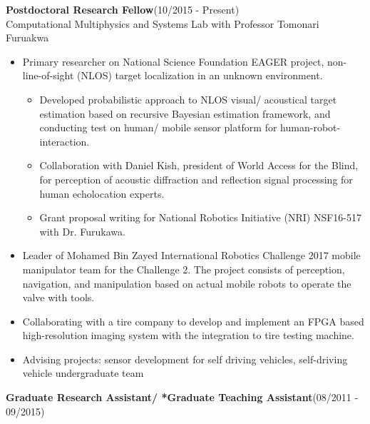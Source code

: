 \documentclass[11pt,letterpaper]{article}
\begin{document}
{\bfseries Postdoctoral Research Fellow}\hfill {(10/2015 - Present)}
\\Computational Multiphysics and Systems Lab with Professor Tomonari Furuakwa\\
\begin{itemize}
	\item Primary researcher on National Science Foundation EAGER project, non-line-of-sight (NLOS) target localization in an unknown environment.
	\begin{itemize}
		\item Developed probabilistic approach to NLOS visual/ acoustical target estimation based on recursive Bayesian estimation framework, and conducting test on human/ mobile sensor platform for human-robot-interaction.
		\item Collaboration with Daniel Kish, president of World Access for the Blind, for perception of acoustic diffraction and reflection signal processing for human echolocation experts.
		\item Grant proposal writing for National Robotics Initiative (NRI) NSF16-517 with Dr. Furukawa.
	\end{itemize}
	\item Leader of Mohamed Bin Zayed International Robotics Challenge 2017 mobile manipulator team for the Challenge 2. The project consists of perception, navigation, and manipulation based on actual mobile robots to operate the valve with tools.
	\item Collaborating with a tire company to develop and implement an FPGA based high-resolution imaging system with the integration to tire testing machine.
	\item Advising projects: sensor development for self driving vehicles, self-driving vehicle undergraduate team
\end{itemize}
{\bfseries Graduate Research Assistant/ *Graduate Teaching Assistant}\hfill {(08/2011 - 09/2015)}\\
\end{document}
